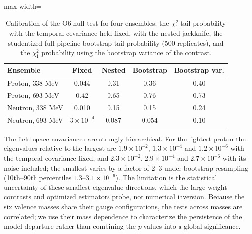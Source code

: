 \documentclass[aps,prd,preprint,nofootinbib,floatfix]{revtex4-2}
\begin{document}
\begin{table}[t]
\caption{Calibration of the O6 null test for four ensembles: the $\chi^2_1$ tail probability with the temporal covariance held fixed, with the nested jackknife, the studentized full-pipeline bootstrap tail probability (500 replicates), and the $\chi^2_1$ probability using the bootstrap variance of the contrast.}
\label{tab:bootcal}
\centering
\begin{adjustbox}{max width=\columnwidth}
\setlength{\tabcolsep}{5pt}\begin{tabular}{lcccc}
\toprule
Ensemble & Fixed & Nested & Bootstrap & Bootstrap var.\\
\midrule
Proton, 338 MeV & 0.044 & 0.31 & 0.36 & 0.40\\
Proton, 693 MeV & 0.42 & 0.65 & 0.76 & 0.73\\
Neutron, 338 MeV & 0.010 & 0.15 & 0.15 & 0.24\\
Neutron, 693 MeV & $3\times10^{-4}$ & 0.087 & 0.054 & 0.10\\
\bottomrule
\end{tabular}
\end{adjustbox}
\end{table}

The field-space covariances are strongly hierarchical. For the lightest proton the eigenvalues relative to the largest are $1.9\times10^{-2}$, $1.3\times10^{-4}$ and $1.2\times10^{-6}$ with the temporal covariance fixed, and $2.3\times10^{-2}$, $2.9\times10^{-4}$ and $2.7\times10^{-6}$ with its noise included; the smallest varies by a factor of 2--3 under bootstrap resampling (10th--90th percentiles $1.3$--$3.1\times10^{-6}$). The limitation is the statistical uncertainty of these smallest-eigenvalue directions, which the large-weight contrasts and optimized estimators probe, not numerical inversion. Because the six valence masses share their gauge configurations, the tests across masses are correlated; we use their mass dependence to characterize the persistence of the model departure rather than combining the $p$ values into a global significance.
\end{document}
